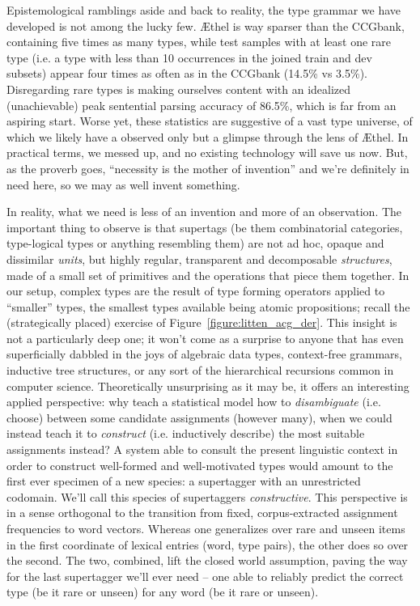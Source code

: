 Epistemological ramblings aside and back to reality, the type grammar we have developed is not among the lucky few.
\AE thel is way sparser than the CCGbank, containing five times as many types, while test samples with at least one rare type (i.e. a type with less than 10 occurrences in the joined train and dev subsets) appear four times as often as in the CCGbank (14.5\% vs 3.5\%).
Disregarding rare types is making ourselves content with an idealized (unachievable) peak sentential parsing accuracy of 86.5\%, which is far from an aspiring start.
Worse yet, these statistics are suggestive of a vast type universe, of which we likely have a observed only but a glimpse through the lens of \AE thel.
In practical terms, we messed up, and no existing technology will save us now.
But, as the proverb goes, ``necessity is the mother of invention'' and we're definitely in need here, so we may as well invent something.

In reality, what we need is less of an invention and more of an observation.
The important thing to observe is that supertags (be them combinatorial categories, type-logical types or anything resembling them) are not ad hoc, opaque and dissimilar \textit{units}, but highly regular, transparent and decomposable \textit{structures}, made of a small set of primitives and the operations that piece them together.
In our setup, complex types are the result of type forming operators applied to ``smaller'' types, the smallest types available being atomic propositions; recall the (strategically placed) exercise of Figure~\ref{figure:litten_acg_der}.
This insight is not a particularly deep one; it won't come as a surprise to anyone that has even superficially dabbled in the joys of algebraic data types, context-free grammars, inductive tree structures, or any sort of the hierarchical recursions common in computer science.
Theoretically unsurprising as it may be, it offers an interesting applied perspective: why teach a statistical model how to \textit{disambiguate} (i.e. choose) between some candidate assignments (however many), when we could instead teach it to \textit{construct} (i.e. inductively describe) the most suitable assignments instead?
A system able to consult the present linguistic context in order to construct well-formed and well-motivated types would amount to the first ever specimen of a new species: a supertagger with an unrestricted codomain.
We'll call this species of supertaggers \textit{constructive}.
This perspective is in a sense orthogonal to the transition from fixed, corpus-extracted assignment frequencies to word vectors. Whereas one generalizes over rare and unseen items in the first coordinate of lexical entries (\textlangle word, type\textrangle{} pairs), the other does so over the second.
The two, combined, lift the closed world assumption, paving the way for the last supertagger we'll ever need -- one able to reliably predict the correct type (be it rare or unseen) for any word (be it rare or unseen).

